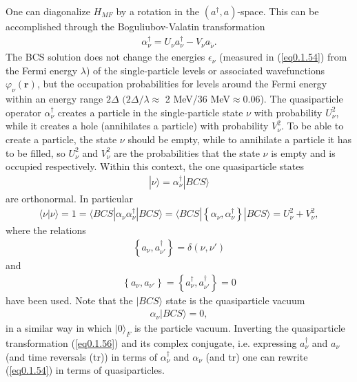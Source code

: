 \documentclass[a4paper,11pt]{book}
\numberwithin{equation}{section}
\numberwithin{figure}{section}
\numberwithin{table}{section}
\newcommand{\braket}[1]{\langle {#1} \rangle }
\newcommand{\ket}[1]{|{#1} \rangle }
\begin{document}
One can diagonalize $H_{MF}$ by a rotation in the $(a^\dagger,a)$-space. This can be accomplished through the Boguliubov-Valatin transformation
\begin{align}\label{eq0.1.56}
\alpha^\dagger_\nu=U_\nu a^\dagger_\nu-V_\nu a_{\tilde\nu}.
\end{align}
The BCS solution does not change the energies $\epsilon_\nu$ (measured in (\ref{eq0.1.54}) from the Fermi energy $\lambda$) of the single-particle levels or associated wavefunctions $\varphi_{\nu}(\mathbf r)$, but the occupation probabilities for levels around the Fermi energy within an energy range $2\Delta$ $(2\Delta/\lambda\approx$ 2 MeV/36 MeV$\approx0.06$). The quasiparticle operator $\alpha^\dagger_\nu$ creates a particle in the single-particle state $\nu$ with probability $U^2_\nu$, while it creates a hole (annihilates a particle) with probability $V^2_\nu$. To be able to create a particle, the state $\nu$ should be empty, while to annihilate a particle it has to be filled, so $U^2_\nu$ and $V^2_\nu$ are the probabilities  that the state $\nu$ is empty and is occupied respectively. Within this context, the one quasiparticle states   
\begin{align}\label{eq0.1.57}
\ket{\nu}=\alpha^\dagger_\nu\ket{BCS}
\end{align}
are orthonormal. In particular
\begin{align}\label{eq0.1.58}
\braket{\nu|\nu}=1=\braket{BCS|\alpha_{\nu}\alpha^\dagger_\nu|BCS}=\braket{BCS|\left\{\alpha_{\nu},\alpha^\dagger_\nu\right\}|BCS}=U^2_\nu+V^2_\nu,
\end{align}
where the relations
\begin{align}\label{eq0.1.59}
\left\{a_{\nu},a^\dagger_{\nu'}\right\}=\delta(\nu,\nu')
\end{align}
and
\begin{align}\label{eq0.1.60}
\left\{a_{\nu},a_{\nu'}\right\}=\left\{a^\dagger_{\nu},a^\dagger_{\nu'}\right\}=0
\end{align}
have been used. Note that the $\ket{BCS}$ state is the quasiparticle vacuum
\begin{align}\label{eq0.1.61}
\alpha_\nu\ket{BCS}=0,
\end{align}
in a similar way in which $\ket{0}_F$ is the particle vacuum. Inverting the quasiparticle transformation (\ref{eq0.1.56}) and its complex conjugate, i.e. expressing $a_\nu^\dagger$ and $a_\nu$ (and time reversals (tr)) in terms of $\alpha^\dagger_\nu$ and $\alpha_\nu$ (and tr) one can rewrite (\ref{eq0.1.54}) in terms of quasiparticles.
\end{document}
